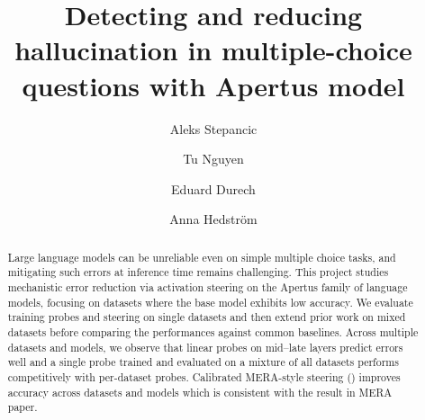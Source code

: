 \documentclass[sigconf]{acmart}
\begin{document}
\title[DSL]{Detecting and reducing hallucination in
multiple-choice questions with Apertus model}


\author{Aleks Stepancic}
\author{Tu Nguyen}
\authornotemark[1]




\author{Eduard Durech}
\author{Anna Hedström}


\renewcommand{\shortauthors}{Team 16}

\begin{abstract}
  Large language models can be unreliable even on simple multiple choice tasks, and mitigating such errors at inference time remains challenging. This project studies mechanistic error reduction via activation steering on the Apertus family of language models, focusing on datasets where the base model exhibits low accuracy. We evaluate training probes and steering on single datasets and then extend prior work on mixed datasets before comparing the performances against common baselines. Across multiple datasets and models, we observe that linear probes on mid–late layers predict errors well and a single probe trained and evaluated on a mixture of all datasets performs competitively with per-dataset probes. Calibrated MERA-style steering (\cite{hedstrom2025to}) improves accuracy across datasets and models which is consistent with the result in MERA paper.
\end{abstract}
\end{document}
